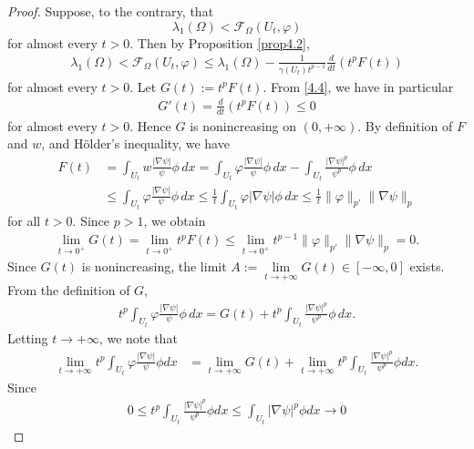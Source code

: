 \documentclass[11pt,leqno]{amsart}
\numberwithin{equation}{section}
\begin{document}
\begin{proof}
    Suppose, to the contrary, that
    $$\lambda_{1}(\Omega)< \mathcal{F}_{\Omega}(U_{t},\varphi)$$ for almost every $t>0$.
Then by Proposition \ref{prop4.2},
\begin{align}\label{4.4}
    \lambda_{1}(\Omega)<\mathcal{F}_{\Omega}(U_{t},\varphi)\leq \lambda_1(\Omega) - \frac{1}{\gamma (U_t) t^{p-1}} \frac{d}{dt} \left( t^p F(t) \right)
\end{align}
  for almost every $t>0$.  Let $G(t) := t^p F(t)$. From \eqref{4.4}, we have in particular
\begin{align*}
G'(t) = \frac{d}{dt} \left(t^p F(t)\right) \leq 0
\end{align*}
for almost every $t>0$. Hence $G$ is nonincreasing on $(0,+\infty)$.  By definition of $F$ and $w$, and H\"older's inequality, we have
\begin{align*}
F(t) &= \int_{U_t} w \frac{|\nabla \psi|}{\psi} \phi \, dx
= \int_{U_t} \varphi \frac{|\nabla \psi|}{\psi}\phi  \, dx - \int_{U_t} \frac{|\nabla \psi|^p}{\psi^p} \phi \, dx \\
&\leq \int_{U_t} \varphi \frac{|\nabla \psi|}{\psi} \phi \, dx
\leq \frac{1}{t} \int_{U_t} \varphi |\nabla \psi| \phi \, dx
\leq \frac{1}{t} \|\varphi\|_{p'} \|\nabla \psi\|_p
\end{align*}
for all $t>0$. Since $p > 1$, we obtain
\begin{align}\label{Gt at 0}
    \lim_{t \to 0^{+}} G(t) = \lim_{t \to 0^{+}} t^p F(t) \leq \lim_{t \to 0^{+}} t^{p-1} \|\varphi\|_{p'} \|\nabla \psi\|_p = 0.
\end{align}
Since $G(t)$ is nonincreasing, the limit $A:=\lim\limits_{t\rightarrow +\infty}G(t)\in [-\infty, 0]$ exists. From the definition of $G$, 
\begin{align*}
    t^{p}\int_{U_{t}}\varphi \frac{|\nabla\psi|}{\psi}\phi \, dx=G(t)+t^{p}\int_{U_{t}}\frac{|\nabla \psi|^{p}}{\psi^{p}}\phi \, dx.
\end{align*}
Letting $t\rightarrow +\infty$, we note that
\begin{align*}
    \lim_{t\rightarrow +\infty} t^{p}\int_{U_{t}}\varphi \frac{|\nabla\psi|}{\psi}\phi dx&= \lim_{t\rightarrow +\infty}G(t)+ \lim_{t\rightarrow +\infty}t^{p}\int_{U_{t}}\frac{|\nabla \psi|^{p}}{\psi^{p}}\phi dx.
\end{align*}
Since 
\begin{align*}
   0\leq  t^{p}\int_{U_{t}}\frac{|\nabla \psi|^{p}}{\psi^{p}}\phi dx\leq \int_{U_{t}}|\nabla \psi|^{p}\phi dx\rightarrow 0
\end{align*}

\end{proof}
\end{document}
